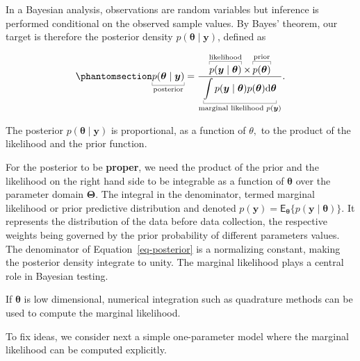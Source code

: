 \documentclass[
  11pt,
  letterpaper,
]{scrbook}
\theoremstyle{definition}
\theoremstyle{plain}
\theoremstyle{plain}
\theoremstyle{definition}
\theoremstyle{definition}
\theoremstyle{remark}
\begin{document}
In a Bayesian analysis, observations are random variables but inference
is performed conditional on the observed sample values. By Bayes'
theorem, our target is therefore the posterior density
\(p(\boldsymbol{\theta} \mid \boldsymbol{y})\), defined as

\begin{equation}\phantomsection\label{eq-posterior}{
\underbracket[0.25pt]{p(\boldsymbol{\theta} \mid \boldsymbol{y})}_{\text{posterior}} = \frac{\overbracket[0.25pt]{p(\boldsymbol{y} \mid \boldsymbol{\theta})}^{\text{likelihood}} \times  \overbracket[0.25pt]{p(\boldsymbol{\theta})}^{\text{prior}}}{\underbracket[0.25pt]{\int p(\boldsymbol{y} \mid \boldsymbol{\theta}) p(\boldsymbol{\theta}) \mathrm{d} \boldsymbol{\theta}}_{\text{marginal likelihood }p(\boldsymbol{y})}}.
}\end{equation}

The posterior \(p(\boldsymbol{\theta} \mid \boldsymbol{y})\) is
proportional, as a function of \(\theta,\) to the product of the
likelihood and the prior function.

For the posterior to be \textbf{proper}, we need the product of the
prior and the likelihood on the right hand side to be integrable as a
function of \(\boldsymbol{\theta}\) over the parameter domain
\(\boldsymbol{\Theta}\). The integral in the denominator, termed
marginal likelihood or prior predictive distribution and denoted
\(p(\boldsymbol{y}) = \mathsf{E}_{\boldsymbol{\theta}}\{p(\boldsymbol{y} \mid \boldsymbol{\theta})\}\).
It represents the distribution of the data before data collection, the
respective weights being governed by the prior probability of different
parameters values. The denominator of Equation~\ref{eq-posterior} is a
normalizing constant, making the posterior density integrate to unity.
The marginal likelihood plays a central role in Bayesian testing.

If \(\boldsymbol{\theta}\) is low dimensional, numerical integration
such as quadrature methods can be used to compute the marginal
likelihood.

To fix ideas, we consider next a simple one-parameter model where the
marginal likelihood can be computed explicitly.
\end{document}
